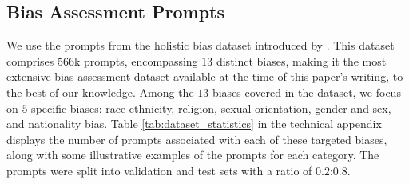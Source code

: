 \documentclass[letterpaper]{article} %
\newcommand{\goncalo}[1]
{\textcolor{orange}{{\bf}{\em #1}{\bf}}}
\begin{document}
\subsection{Bias Assessment Prompts}\label{prompts}
We use the prompts from the holistic bias dataset introduced by \citet{smith2022m}. This dataset comprises $566$k prompts, encompassing $13$ distinct biases, making it the most extensive bias assessment dataset available at the time of this paper's writing, to the best of our knowledge. %
Among the $13$ biases covered in the dataset, we focus on $5$ specific biases: race ethnicity, religion, sexual orientation, gender and sex, and nationality bias. Table \ref{tab:dataset_statistics}  in the technical appendix
displays the number of prompts associated with each of these targeted biases, along with some illustrative examples of the prompts for each category. The prompts were split into validation and test sets with a ratio of $0.2$:$0.8$.
\end{document}
